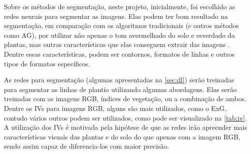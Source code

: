 \documentclass[12pt, a4paper, english, brazil]{article}
\begin{document}
Sobre os métodos de segmentação, neste projeto, inicialmente, foi escolhido as redes neurais para segmentar as imagens. Elas podem ter bom resultado na segmentação, em comparação com os algoritmos tradicionais (e outros métodos como AG), por utilizar não apenas o tom avermelhado do solo e esverdado da plantas, mas outras características que elas conseguem extrair das imagens \cite{Silva_2020}. Dentre essas características, podem ser contornos, formatos de linhas e outros tipos de formatos específicos. 

As redes para segmentação (algumas apresentadas na \autoref{sec:dl}) serão treinadas para segmentar as linhas de plantio utilizando algumas abordagens. Elas serão treinadas com as imagens RGB, índices de vegetação, ou a combinação de ambos. Dentre os IVs para imagens RGB, alguns são mais utilizados, como o ExG, contudo vários outros podem ser utilizados, como pode ser visualizado na \autoref{tab:iv}. A utilização dos IVs é motivada pela hipótese de que as redes irão apreender mais características visuais das plantas e do solo do que apenas com a imagem RGB, sendo assim capaz de diferencia-los com maior precisão.
\end{document}
